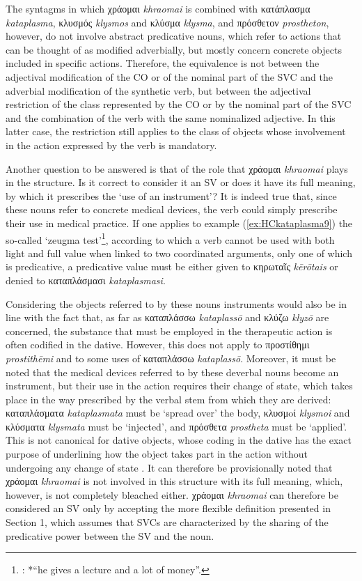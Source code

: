\documentclass[output=paper,colorlinks,citecolor=brown]{langscibook}
\begin{document}
The syntagms in which χράομαι \textit{khraomai} is combined with κατάπλασμα \textit{kataplasma}, κλυσμός \textit{klysmos} and κλύσμα \textit{klysma}, and πρόσθετον \textit{prostheton}, however, do not involve abstract predicative nouns, which refer to actions that can be thought of as modified adverbially, but mostly concern concrete objects included in specific actions. Therefore, the equivalence is not between the adjectival modification of the CO or of the nominal part of the SVC and the adverbial modification of the synthetic verb, but between the adjectival restriction of the class represented by the CO or by the nominal part of the SVC and the combination of the verb with the same nominalized adjective. In this latter case, the restriction still applies to the class of objects whose involvement in the action expressed by the verb is mandatory.

Another question to be answered is that of the role that χράομαι \textit{khraomai} plays in the structure. Is it correct to consider it an SV or does it have its full meaning, by which it prescribes the ‘use of an instrument’? It is indeed true that, since these nouns refer to concrete medical devices, the verb could simply prescribe their use in medical practice. If one applies to example (\ref{ex:HCkataplasma9}) the so-called ‘zeugma test’\footnote{\citet[179]{langer2004linguistic}: *“he gives a lecture and a lot of money”.}, according to which a verb cannot be used with both light and full value when linked to two coordinated arguments, only one of which is predicative, a predicative value must be either given to κηρωταῖς \textit{kērōtais} or denied to καταπλάσμασι \textit{kataplasmasi}. 

Considering the objects referred to by these nouns instruments would also be in line with the fact that, as far as καταπλάσσω \textit{kataplassō} and κλύζω \textit{klyzō} are concerned, the substance that must be employed in the therapeutic action is often codified in the dative. However, this does not apply to προστίθημι \textit{prostithēmi} and to some uses of καταπλάσσω \textit{kataplassō}. Moreover, it must be noted that the medical devices referred to by these deverbal nouns become an instrument, but their use in the action requires their change of state, which takes place in the way prescribed by the verbal stem from which they are derived: καταπλάσματα \textit{kataplasmata} must be ‘spread over’ the body, κλυσμoί \textit{klysmoi} and κλύσματα \textit{klysmata} must be ‘injected’, and πρόσθετα \textit{prostheta} must be ‘applied’. This is not canonical for dative objects, whose coding in the dative has the exact purpose of underlining how the object takes part in the action without undergoing any change of state \citep[66--67]{Luraghi2010}. It can therefore be provisionally noted that χράομαι \textit{khraomai} is not involved in this structure with its full meaning, which, however, is not completely bleached either. χράομαι \textit{khraomai} can therefore be considered an SV only by accepting the more flexible definition presented in Section 1, which assumes that SVCs are characterized by the sharing of the predicative power between the SV and the noun.
\end{document}
